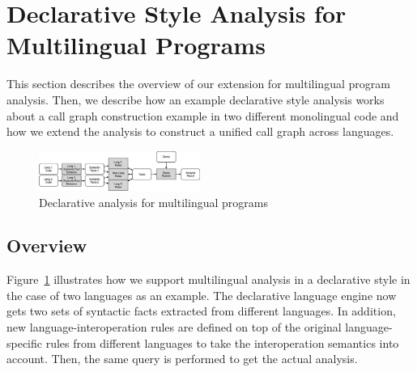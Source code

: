 
\section{Declarative Style Analysis for Multilingual Programs}
This section describes the overview of our extension for multilingual program
analysis. Then, we describe how an example declarative style analysis works
about a call graph construction example in two different monolingual code and
how we extend the analysis to construct a unified call graph across languages.

\begin{figure}[t]
  \centering
  \vspace{2mm}
  \includegraphics[width=0.47\textwidth]{img/ov2.png}
  \caption{Declarative analysis for multilingual programs}
  \label{fig:ov2}
\end{figure}

\subsection{Overview}
Figure~\ref{fig:ov2} illustrates how we support multilingual analysis in a
declarative style in the case of two languages as an example. The declarative
language engine now gets two sets of syntactic facts extracted from different
languages. In addition, new language-interoperation rules are defined on top of
the original language-specific rules from different languages to take the
interoperation semantics into account. Then, the same query is performed to get
the actual analysis.

